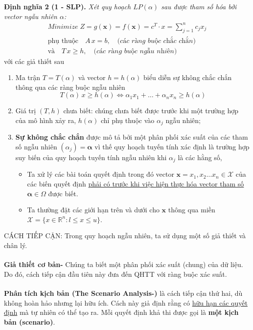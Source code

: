 \documentclass[a4paper]{article}
\begin{document}
    \textbf{Định nghĩa 2 (1 - SLP).} \textit{Xét quy hoạch $LP(\alpha)$ sau được tham số hóa bởi vector ngẫu nhiên $\alpha$:}
    \begin{gather*}
        Minimize \; Z = g(\boldsymbol{x})=f(\boldsymbol{x})= c^T \cdot x=\sum_{j=1}^{n} c_{j} x_{j} \\
        \text{phụ thuộc} \quad A \, x=b, \quad \textit{(các ràng buộc chắc chắn)} \\
        \text{và} \quad T \, x \geq h, \quad \textit{(các ràng buộc ngẫu nhiên)}
    \end{gather*}
    với các giả thiết sau
    \begin{enumerate}
        \item Ma trận $T=T(\alpha)$ và vector $h=h(\alpha)$ biểu diễn sự không chắc chắn thông qua các ràng buộc ngẫu nhiên
            \begin{displaymath}
                T(\alpha) \, x \geq h(\alpha) \Longleftrightarrow \alpha_1 x_{1} + \dots + \alpha_n x_{n} \geq h(\alpha)
            \end{displaymath}
        \item Giá trị $(T,h)$ chưa biết: chúng chưa biết được trước khi một trường hợp của mô hình xảy ra, 
            $h(\alpha)$ chỉ phụ thuộc vào $\alpha_j$ ngẫu nhiên;
        \item \textbf{Sự không chắc chắn} được mô tả bởi một phân phối xác suất của các tham số
            ngẫu nhiên $(\alpha_j)=\boldsymbol{\alpha}$ vì thế quy hoạch tuyến tính xác định là 
            trường hợp suy biến của quy hoạch tuyến tính ngẫu nhiên khi $\alpha_j$ là các hằng số,
            \begin{itemize}
                \item Ta xử lý các bài toán quyết định trong đó vector $\boldsymbol{x}=x_{1},x_{2} \dotsc x_{n} \in \mathcal{X}$
                của các biến quyết định \underline{phải có trước khi việc hiện thực hóa vector tham số}
                $\boldsymbol{\alpha} \in \Omega$ được biết.
                \item Ta thường đặt các giới hạn trên và dưới cho $\boldsymbol{x}$ thông qua 
                    miền $\mathcal{X} = \{x \in \mathbb{R}^{n}: l \leq x \leq u \}$.
            \end{itemize}
    \end{enumerate}
    CÁCH TIẾP CẬN: Trong quy hoạch ngẫu nhiên, ta sử dụng một số giả thiết và chân lý.\\
    \\
    \textbf{Giả thiết cơ bản-} Chúng ta biết một phân phối xác suất (chung) của dữ liệu. Do đó, cách
    tiếp cận đầu tiên này đưa đến QHTT với ràng buộc xác suất.\\
    \\
    \textbf{Phân tích kịch bản (The Scenario Analysis-)} là cách tiếp cận thứ hai, dù không hoàn hảo nhưng lại hữu ích.
    Cách này giả định rằng có \underline{hữu hạn các quyết định} mà tự nhiên có thể tạo ra.
    Mỗi quyết định khả thi được gọi là \textbf{một kịch bản (scenario)}.
\end{document}
